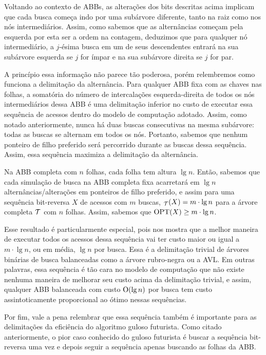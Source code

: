 Voltando ao contexto de ABBs, as alterações dos bits descritas acima implicam que cada busca começa indo por uma subárvore diferente, tanto na raiz como nos nós intermediários. Assim, como sabemos que as alternâncias começam pela esquerda por esta ser a ordem na contagem, deduzimos que para qualquer nó intermediário, a $j$-ésima busca em um de seus descendentes entrará na sua subárvore esquerda se $j$ for ímpar e na sua subárvore direita se $j$ for par.

A princípio essa informação não parece tão poderosa, porém relembremos como funciona a delimitação da alternância. Para qualquer ABB fixa com as chaves nas folhas, a somatória do número de intercalações esquerda-direita de todos os nós intermediários dessa ABB é uma delimitação inferior no custo de executar essa sequência de acessos dentro do modelo de computação adotado. Assim, como notado anteriormente, nunca há duas buscas consecutivas na mesma subárvore: todas as buscas se alternam em todos os nós. Portanto, sabemos que nenhum ponteiro de filho preferido será percorrido durante as buscas dessa sequência. Assim, essa sequência maximiza a delimitação da alternância.

Na ABB completa com $n$ folhas, cada folha tem altura $\lg n$. Então, sabemos que cada simulação de busca na ABB completa fixa acarretará em $\lg n$ alternâncias/alterações em ponteiros de filho preferido, e assim para uma sequência bit-reversa $X$ de acessos com $m$ buscas, \Alt$_{\mathcal{T}}(X) = m \cdot \lg n$ para a árvore completa $\mathcal{T}$ com $n$ folhas. Assim, sabemos que $\mathrm{OPT}(X) \geq m \cdot \lg n$.

Esse resultado é particularmente especial, pois nos mostra que a melhor maneira de executar todos os acessos dessa sequência vai ter custo maior ou igual a $m \cdot \lg n$, ou em média, $\lg n$ por busca. Essa é a delimitação trivial de árvores binárias de busca balanceadas como a árvore rubro-negra ou a AVL. Em outras palavras, essa sequência é tão cara no modelo de computação que não existe nenhuma maneira de melhorar seu custo acima da delimitação trivial, e assim, qualquer ABB balanceada com custo $\mathrm{O}(\lg n)$ por busca tem custo assintoticamente proporcional ao ótimo nessas sequências.

Por fim, vale a pena relembrar que essa sequência também é importante para as delimitações da eficiência do algoritmo guloso futurista. Como citado anteriormente, o pior caso conhecido do guloso futurista é buscar a sequência bit-reversa uma vez e depois seguir a sequência apenas buscando as folhas da ABB.

